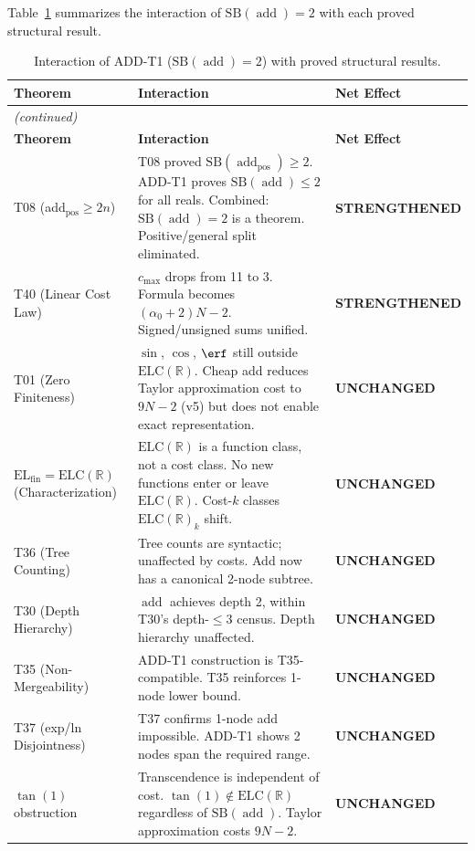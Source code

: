 \documentclass[12pt,a4paper]{article}
\theoremstyle{definition}
\newcommand{\addop}{\operatorname{add}}
\newcommand{\SB}{\mathrm{SB}}
\newcommand{\ELC}{\mathrm{ELC}(\mathbb{R})}
\newcommand{\ELfin}{\mathrm{EL}_{\mathrm{fin}}}
\begin{document}
Table~\ref{tab:summary} summarizes the interaction of $\SB(\addop)=2$ with
each proved structural result.

\begin{longtable}{@{}p{2.5cm}p{5.5cm}p{4.5cm}@{}}
\caption{Interaction of ADD-T1 ($\SB(\addop)=2$) with proved structural results.}
\label{tab:summary}\\
\toprule
\textbf{Theorem} & \textbf{Interaction} & \textbf{Net Effect} \\
\midrule
\endfirsthead
\multicolumn{3}{l}{\footnotesize\textit{(continued)}}\\
\toprule
\textbf{Theorem} & \textbf{Interaction} & \textbf{Net Effect} \\
\midrule
\endhead
\bottomrule
\endlastfoot
T08
(add$_{\text{pos}} \geq 2n$)
&
T08 proved $\SB(\addop_{\text{pos}})\geq 2$.
ADD-T1 proves $\SB(\addop)\leq 2$ for all reals.
Combined: $\SB(\addop)=2$ is a theorem.
Positive/general split eliminated.
&
\textbf{\textcolor{strengthened}{STRENGTHENED}}\\[6pt]
T40
(Linear Cost Law)
&
$c_{\max}$ drops from 11 to 3.
Formula becomes $(\alpha_0+2)N-2$.
Signed/unsigned sums unified.
&
\textbf{\textcolor{strengthened}{STRENGTHENED}}\\[6pt]
T01
(Zero Finiteness)
&
$\sin$, $\cos$, $\erf$ still outside $\ELC$.
Cheap add reduces Taylor approximation cost
to $9N-2$ (v5) but does not enable exact
representation.
&
\textbf{\textcolor{unchanged}{UNCHANGED}}\\[6pt]
$\ELfin = \ELC$
(Characterization)
&
$\ELC$ is a function class, not a cost class.
No new functions enter or leave $\ELC$.
Cost-$k$ classes $\ELC_k$ shift.
&
\textbf{\textcolor{unchanged}{UNCHANGED}}\\[6pt]
T36
(Tree Counting)
&
Tree counts are syntactic; unaffected by costs.
Add now has a canonical 2-node subtree.
&
\textbf{\textcolor{unchanged}{UNCHANGED}}\\[6pt]
T30
(Depth Hierarchy)
&
$\addop$ achieves depth 2, within T30's
depth-$\leq 3$ census.
Depth hierarchy unaffected.
&
\textbf{\textcolor{unchanged}{UNCHANGED}}\\[6pt]
T35
(Non-Mergeability)
&
ADD-T1 construction is T35-compatible.
T35 reinforces 1-node lower bound.
&
\textbf{\textcolor{unchanged}{UNCHANGED}}\\[6pt]
T37
(exp/ln Disjointness)
&
T37 confirms 1-node add impossible.
ADD-T1 shows 2 nodes span the required range.
&
\textbf{\textcolor{unchanged}{UNCHANGED}}\\[6pt]
$\tan(1)$ obstruction
&
Transcendence is independent of cost.
$\tan(1)\notin\ELC$ regardless of $\SB(\addop)$.
Taylor approximation costs $9N-2$.
&
\textbf{\textcolor{unchanged}{UNCHANGED}}\\
\end{longtable}
\end{document}
